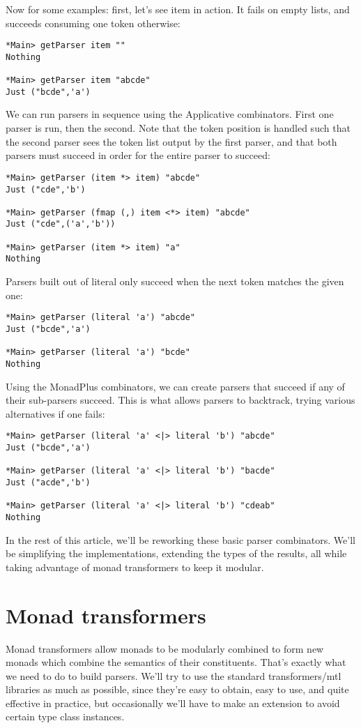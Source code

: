 \documentclass{tmr}
\begin{document}
Now for some examples:  first, let's see item in action.  It fails on empty lists,
and succeeds consuming one token otherwise:
\begin{verbatim}
*Main> getParser item ""
Nothing

*Main> getParser item "abcde"
Just ("bcde",'a')
\end{verbatim}
We can run parsers in sequence using the Applicative combinators.  First one parser
is run, then the second.  Note that the token position is handled such that the
second parser sees the token list output by the first parser, and that both parsers
must succeed in order for the entire parser to succeed:
\begin{verbatim}
*Main> getParser (item *> item) "abcde"
Just ("cde",'b')

*Main> getParser (fmap (,) item <*> item) "abcde"
Just ("cde",('a','b'))

*Main> getParser (item *> item) "a"
Nothing
\end{verbatim}
Parsers built out of literal only succeed when the next token matches the given
one:
\begin{verbatim}
*Main> getParser (literal 'a') "abcde"
Just ("bcde",'a')

*Main> getParser (literal 'a') "bcde"
Nothing
\end{verbatim}
Using the MonadPlus combinators, we can create parsers that succeed if any of
their sub-parsers succeed.  This is what allows parsers to backtrack, trying
various alternatives if one fails:
\begin{verbatim}
*Main> getParser (literal 'a' <|> literal 'b') "abcde"
Just ("bcde",'a')

*Main> getParser (literal 'a' <|> literal 'b') "bacde"
Just ("acde",'b')

*Main> getParser (literal 'a' <|> literal 'b') "cdeab"
Nothing
\end{verbatim}
In the rest of this article, we'll be reworking these basic parser combinators.
We'll be simplifying the implementations, extending the types of the results,
all while taking advantage of monad transformers to keep it modular.




\section{Monad transformers}
Monad transformers allow monads to be modularly combined to form new monads
which combine the semantics of their constituents.  That's exactly what we need
to do to build parsers.
We'll try to use the standard transformers/mtl libraries as much as possible, 
since they're easy to obtain, easy to use, and quite effective in practice, but
occasionally we'll have to make an extension to avoid certain type class
instances.
\end{document}
